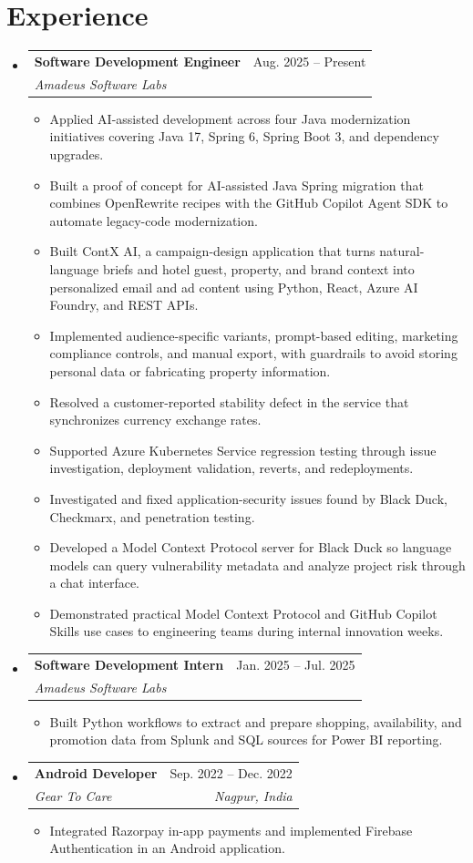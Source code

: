 \documentclass[a4paper,11pt]{article}
\makeatletter
\newcommand{\entry}[4]{\item\begin{tabularx}{\textwidth}{@{}Xr@{}}\textbf{#1}& #2\\\textit{\small #3}&\textit{\small #4}\end{tabularx}\vspace{-5pt}}
\newcommand{\bulletpoint}[1]{\item\small{#1}}
\makeatother
\begin{document}
\section{Experience}
\begin{itemize}[leftmargin=0in,label={}]
  \entry{Software Development Engineer}{Aug. 2025 -- Present}{Amadeus Software Labs}{}
  \begin{itemize}
    \bulletpoint{Applied AI-assisted development across four Java modernization initiatives covering Java 17, Spring 6, Spring Boot 3, and dependency upgrades.}
    \bulletpoint{Built a proof of concept for AI-assisted Java Spring migration that combines OpenRewrite recipes with the GitHub Copilot Agent SDK to automate legacy-code modernization.}
    \bulletpoint{Built ContX AI, a campaign-design application that turns natural-language briefs and hotel guest, property, and brand context into personalized email and ad content using Python, React, Azure AI Foundry, and REST APIs.}
    \bulletpoint{Implemented audience-specif{}ic variants, prompt-based editing, marketing compliance controls, and manual export, with guardrails to avoid storing personal data or fabricating property information.}
    \bulletpoint{Resolved a customer-reported stability defect in the service that synchronizes currency exchange rates.}
    \bulletpoint{Supported Azure Kubernetes Service regression testing through issue investigation, deployment validation, reverts, and redeployments.}
    \bulletpoint{Investigated and f{}ixed application-security issues found by Black Duck, Checkmarx, and penetration testing.}
    \bulletpoint{Developed a Model Context Protocol server for Black Duck so language models can query vulnerability metadata and analyze project risk through a chat interface.}
    \bulletpoint{Demonstrated practical Model Context Protocol and GitHub Copilot Skills use cases to engineering teams during internal innovation weeks.}
  \end{itemize}
  \entry{Software Development Intern}{Jan. 2025 -- Jul. 2025}{Amadeus Software Labs}{}
  \begin{itemize}
    \bulletpoint{Built Python workf{}lows to extract and prepare shopping, availability, and promotion data from Splunk and SQL sources for Power BI reporting.}
  \end{itemize}
  \entry{Android Developer}{Sep. 2022 -- Dec. 2022}{Gear To Care}{Nagpur, India}
  \begin{itemize}
    \bulletpoint{Integrated Razorpay in-app payments and implemented Firebase Authentication in an Android application.}
  \end{itemize}
\end{itemize}
\end{document}
